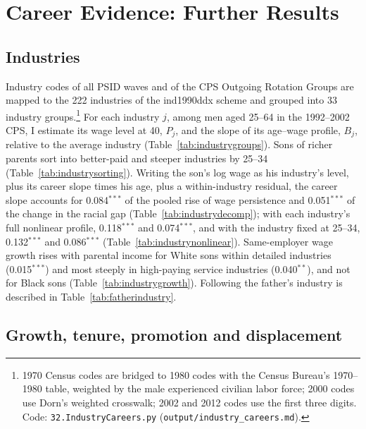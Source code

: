 \section{Career Evidence: Further Results}\label{app:careers}

\subsection{Industries}

Industry codes of all PSID waves and of the CPS Outgoing Rotation Groups are mapped to the 222 industries of the
ind1990ddx scheme and grouped into 33 industry groups.\footnote{1970 Census codes are bridged to 1980 codes with the
Census Bureau's 1970--1980 table, weighted by the male experienced civilian labor force; 2000 codes use Dorn's weighted
crosswalk; 2002 and 2012 codes use the first three digits. Code: \texttt{32.IndustryCareers.py}
(\texttt{output/industry\_careers.md}).} For each industry $j$, among men aged 25--64 in the 1992--2002 CPS, I estimate
its wage level at 40, $P_j$, and the slope of its age--wage profile, $B_j$, relative to the average industry
(Table~\ref{tab:industrygroups}). Sons of richer parents sort into better-paid and steeper industries by 25--34
(Table~\ref{tab:industrysorting}). Writing the son's log wage as his industry's level, plus its career slope times his
age, plus a within-industry residual, the career slope accounts for 0.084$^{***}$ of the pooled rise of wage
persistence and 0.051$^{***}$ of the change in the racial gap (Table~\ref{tab:industrydecomp}); with each industry's
full nonlinear profile, 0.118$^{***}$ and 0.074$^{***}$, and with the industry fixed at 25--34, 0.132$^{***}$ and
0.086$^{***}$ (Table~\ref{tab:industrynonlinear}). Same-employer wage growth rises with parental income for White sons
within detailed industries (0.015$^{***}$) and most steeply in high-paying service industries (0.040$^{**}$), and not for
Black sons (Table~\ref{tab:industrygrowth}). Following the father's industry is described in
Table~\ref{tab:fatherindustry}.








\subsection{Growth, tenure, promotion and displacement}


